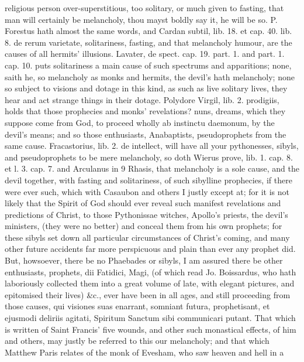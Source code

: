 {religious person over-superstitious, too solitary, or much given to
fasting, that man will certainly be melancholy, thou mayst boldly say
it, he will be so. P. Forestus hath almost the same words, and
Cardan subtil, lib. 18. et cap. 40. lib. 8. de rerum varietate,
solitariness, fasting, and that melancholy humour, are the causes of
all hermits' illusions. Lavater, de spect. cap. 19. part. 1. and part.
1. cap. 10. puts solitariness a main cause of such spectrums and
apparitions; none, saith he, so melancholy as monks and hermits, the
devil's hath melancholy; none so subject to visions and dotage in
this kind, as such as live solitary lives, they hear and act strange
things in their dotage. Polydore Virgil, lib. 2. prodigiis, holds
that those prophecies and monks' revelations? nuns, dreams, which they
suppose come from God, to proceed wholly ab instinctu daemonum, by the
devil's means; and so those enthusiasts, Anabaptists, pseudoprophets
from the same cause. Fracastorius, lib. 2. de intellect, will
have all your pythonesses, sibyls, and pseudoprophets to be mere
melancholy, so doth Wierus prove, lib. 1. cap. 8. et l. 3. cap. 7. and
Arculanus in 9 Rhasis, that melancholy is a sole cause, and the devil
together, with fasting and solitariness, of such sibylline prophecies,
if there were ever such, which with Casaubon and others I justly
except at; for it is not likely that the Spirit of God should ever
reveal such manifest revelations and predictions of Christ, to those
Pythonissae witches, Apollo's priests, the devil's ministers, (they
were no better) and conceal them from his own prophets; for these
sibyls set down all particular circumstances of Christ's coming, and
many other future accidents far more perspicuous and plain than ever
any prophet did. But, howsoever, there be no Phaebades or sibyls, I am
assured there be other enthusiasts, prophets, dii Fatidici, Magi, (of
which read Jo. Boissardus, who hath laboriously collected them into a
great volume of late, with elegant pictures, and epitomised their
lives) \&c., ever have been in all ages, and still proceeding from those
causes, qui visiones suas enarrant, somniant futura,
prophetisant, et ejusmodi deliriis agitati, Spiritum Sanctum sibi
communicari putant. That which is written of Saint Francis' five
wounds, and other such monastical effects, of him and others, may
justly be referred to this our melancholy; and that which Matthew Paris
relates of the monk of Evesham, who saw heaven and hell in a
}
